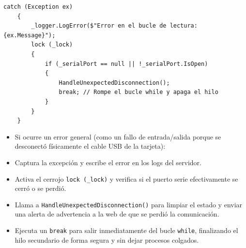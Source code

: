 \documentclass[
10pt, %
a4paper, %
oneside, %
headinclude,footinclude, %
BCOR5mm, %
]{scrartcl}
\begin{document}
\begin{enumerate}
\begin{enumerate}[label=\Alph*.]
\begin{lstlisting}[style=VSCodeDark]
	catch (Exception ex)
	{
		_logger.LogError($"Error en el bucle de lectura: {ex.Message}");
		lock (_lock)
		{
			if (_serialPort == null || !_serialPort.IsOpen)
			{
				HandleUnexpectedDisconnection();
				break; // Rompe el bucle while y apaga el hilo
			}
		}
	}\end{lstlisting}
	\begin{itemize}
		\item Si ocurre un error general (como un fallo de entrada/salida porque se desconectó físicamente el cable USB de la tarjeta):
		\item Captura la excepción y escribe el error en los logs del servidor.
		\item Activa el cerrojo \texttt{lock (\_lock)} y verifica si el puerto serie efectivamente se cerró o se perdió.
		\item Llama a \texttt{HandleUnexpectedDisconnection()} para limpiar el estado y enviar una alerta de advertencia a la web de que se perdió la comunicación.
		\item Ejecuta un \texttt{break} para salir inmediatamente del bucle \texttt{while}, finalizando el hilo secundario de forma segura y sin dejar procesos colgados.
	\end{itemize}
	\end{enumerate}
\end{enumerate}

\newpage
\end{document}

